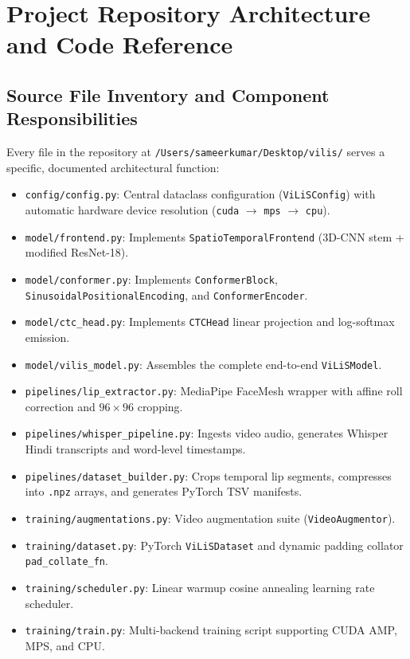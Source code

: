 \documentclass[11pt,a4paper]{report}
\begin{document}
\chapter{Project Repository Architecture and Code Reference}

\section{Source File Inventory and Component Responsibilities}
Every file in the repository at \texttt{/Users/sameerkumar/Desktop/vilis/} serves a specific, documented architectural function:
\begin{itemize}
    \item \texttt{config/config.py}: Central dataclass configuration (\texttt{ViLiSConfig}) with automatic hardware device resolution (\texttt{cuda} $\to$ \texttt{mps} $\to$ \texttt{cpu}).
    \item \texttt{model/frontend.py}: Implements \texttt{SpatioTemporalFrontend} (3D-CNN stem + modified ResNet-18).
    \item \texttt{model/conformer.py}: Implements \texttt{ConformerBlock}, \texttt{SinusoidalPositionalEncoding}, and \texttt{ConformerEncoder}.
    \item \texttt{model/ctc\_head.py}: Implements \texttt{CTCHead} linear projection and log-softmax emission.
    \item \texttt{model/vilis\_model.py}: Assembles the complete end-to-end \texttt{ViLiSModel}.
    \item \texttt{pipelines/lip\_extractor.py}: MediaPipe FaceMesh wrapper with affine roll correction and $96 \times 96$ cropping.
    \item \texttt{pipelines/whisper\_pipeline.py}: Ingests video audio, generates Whisper Hindi transcripts and word-level timestamps.
    \item \texttt{pipelines/dataset\_builder.py}: Crops temporal lip segments, compresses into \texttt{.npz} arrays, and generates PyTorch TSV manifests.
    \item \texttt{training/augmentations.py}: Video augmentation suite (\texttt{VideoAugmentor}).
    \item \texttt{training/dataset.py}: PyTorch \texttt{ViLiSDataset} and dynamic padding collator \texttt{pad\_collate\_fn}.
    \item \texttt{training/scheduler.py}: Linear warmup cosine annealing learning rate scheduler.
    \item \texttt{training/train.py}: Multi-backend training script supporting CUDA AMP, MPS, and CPU.

\end{itemize}
\end{document}
